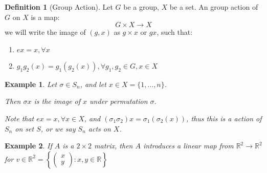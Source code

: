 \documentclass{article}
\theoremstyle{MyNonumberplain}
\theoremstyle{break}
\theoremstyle{break}
\newtheorem{example}{Example}[section]
\theoremstyle{break}
\theoremstyle{definition}
\theoremstyle{break}
\newtheorem{definition}{Definition}[section]
\begin{document}
\begin{defbox}
\begin{definition}[Group Action]

        
        Let $G$ be a group, $X$ be a set. An group action of $G$ on $X$ is a map:
        \[ G \times X \rightarrow X \]
        we will write the image of $(g, x)$ as $g \times x$ or $g x$, such that:
        \begin{enumerate}
          \item $e x = x, \forall x$
          
          \item $g_1 g_2 (x) = g_1 (g_2 (x)), \forall g_1, g_2 \in G, x \in X$
        \end{enumerate}
      \end{definition}
\end{defbox}

\begin{expbox}
    \begin{example}
        Let $\sigma \in S_n$, and let $x \in X = \{ 1, \ldots, n \}$.\bigskip

        Then $\sigma x$ is the image of $x$ under permutation $\sigma$.\bigskip

        Note that $e x = x, \forall x \in X$, and $(\sigma_1 \sigma_2) x = \sigma_1
        (\sigma_2 (x))$, thus this is a action of $S_n$ on set $S$, or we say $S_n$
        acts on $X$.
    \end{example}
\end{expbox}

\begin{expbox}
    \begin{example}
        If $A$ is a $2 \times 2$ matrix, then $A$ introduces a linear map from
        $\mathbb{R}^2 \rightarrow \mathbb{R}^2$ for $v \in \mathbb{R}^2 = \left\{
        \left(\begin{array}{c}
        x\\
        y
        \end{array}\right) : x, y \in \mathbb{R} \right\}$
    \end{example}
\end{expbox}
\end{document}
